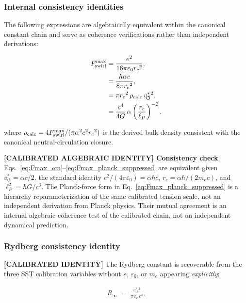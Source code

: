 \documentclass[11pt]{article}
\theoremstyle{definition}
\theoremstyle{plain}
\theoremstyle{remark}
\newcommand{\rc}{{r_c}}
\newcommand{\vchar}{v_{\!\boldsymbol{\circlearrowleft}}^{\ast}}
\begin{document}
        \subsubsection{Internal consistency identities}

        The following expressions are algebraically equivalent within the canonical constant chain and serve as coherence verifications rather than independent derivations:

        \begin{align}
            F_{\rm swirl}^{\max}
            &= \frac{e^2}{16\pi\varepsilon_0 \rc^2},
            \label{eq:Fmax_em}\\
            &= \frac{h\alpha c}{8\pi \rc^2},
            \label{eq:Fmax_hac}\\
            &= \pi \rc^2\,\rho_{\rm calc}\,\vchar{}^2,
            \label{eq:Fmax_rho}\\
            &= \frac{c^4}{4G}\,\alpha
            \left(\frac{\rc}{\ell_P}\right)^{-2}.
            \label{eq:Fmax_planck_suppressed}
        \end{align}

        where $\rho_{\rm calc} = 4F_{\rm swirl}^{\max}/(\pi\alpha^2 c^2 \rc^2)$ is the derived bulk density consistent with the canonical neutral-circulation closure.

        \textbf{[CALIBRATED ALGEBRAIC IDENTITY] Consistency check}: Eqs.~\eqref{eq:Fmax_em}--\eqref{eq:Fmax_planck_suppressed} are equivalent given $\vchar = \alpha c/2$, the standard identity $e^2/(4\pi\varepsilon_0) = \alpha\hbar c$, $\rc=\alpha\hbar/(2m_ec)$, and $\ell_P^2=\hbar G/c^3$. The Planck-force form in Eq.~\eqref{eq:Fmax_planck_suppressed} is a hierarchy reparameterization of the same calibrated tension scale, not an independent derivation from Planck physics. Their mutual agreement is an internal algebraic coherence test of the calibrated chain, not an independent dynamical prediction.

        \subsubsection{Rydberg consistency identity}

        \textbf{[CALIBRATED IDENTITY]} The Rydberg constant is recoverable from the three SST calibration variables without $e$, $\varepsilon_0$, or $m_e$ appearing \emph{explicitly}:

        \begin{align}
            R_\infty \;=\; \frac{\vchar{}^3}{\pi\,\rc\,c^3}.
            \label{eq:Rydberg_SST}
        \end{align}
\end{document}
